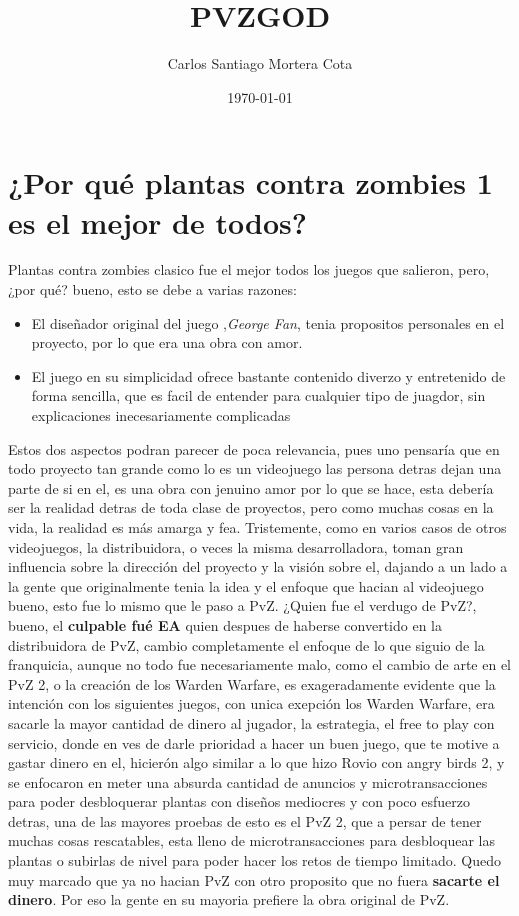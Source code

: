 \documentclass[letterpaper,12pt]{article}
\title{PVZGOD}
\author{Carlos Santiago Mortera Cota}
\date{\today}
\begin{document}
\maketitle

\section{¿Por qué plantas contra zombies 1 es el mejor de todos?}
Plantas contra zombies clasico fue el mejor todos los juegos que salieron, pero, ¿por qué? bueno, esto se debe a varias razones:
\begin{itemize}
    \item El diseñador original del juego ,\textit{George Fan}, tenia propositos personales en el proyecto, por lo que era una obra con amor.
    
    \item El juego en su simplicidad ofrece bastante contenido diverzo y entretenido de forma sencilla, que es facil de entender para cualquier tipo de juagdor, sin explicaciones inecesariamente complicadas
\end{itemize}

Estos dos aspectos podran parecer de poca relevancia, pues uno pensaría que en todo proyecto tan grande como lo es un videojuego las persona detras dejan una parte de si en el, es una obra con jenuino amor por lo que se hace, esta debería ser la realidad detras de toda clase de proyectos, pero como muchas cosas en la vida, la realidad es más amarga y fea. Tristemente, como en varios casos de otros videojuegos, la distribuidora, o veces la misma desarrolladora, toman gran influencia sobre la dirección del proyecto y la visión sobre el, dajando a un lado a la gente que originalmente tenia la idea y el enfoque que hacian al videojuego bueno, esto fue lo mismo que le paso a PvZ.
\newline
¿Quien fue el verdugo de PvZ?, bueno, el \textbf{culpable fué EA} quien despues de haberse convertido en la distribuidora de PvZ, cambio completamente el enfoque de lo que siguio de la franquicia, aunque no todo fue necesariamente malo, como el cambio de arte en el PvZ 2, o la creación de los Warden Warfare, es exageradamente evidente que la intención con los siguientes juegos, con unica exepción los Warden Warfare, era sacarle la mayor cantidad de dinero al jugador, la estrategia, el free to play con servicio, donde en ves de darle prioridad a hacer un buen juego, que te motive a gastar dinero en el, hicierón algo similar a lo que hizo Rovio con angry birds 2, y se enfocaron en meter una absurda cantidad de anuncios y microtransacciones para poder desbloquerar plantas con diseños mediocres y con poco esfuerzo detras, una de las mayores proebas de esto es el PvZ 2, que a persar de tener muchas cosas rescatables, esta lleno de microtransacciones para desbloquear las plantas o subirlas de nivel para poder hacer los retos de tiempo limitado. Quedo muy marcado que ya no hacian PvZ con otro proposito que no fuera \textbf{sacarte el dinero}. Por eso la gente en su mayoria prefiere la obra original de PvZ.
\end{document}
